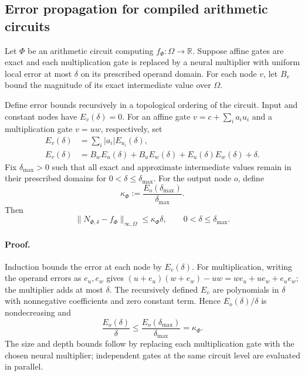 \subsection{Error propagation for compiled arithmetic circuits}
\label{app:circuit-error}

Let $\Phi$ be an arithmetic circuit computing
$f_\Phi:\Omega\to\mathbb R$. Suppose affine gates are exact and each
multiplication gate is replaced by a neural multiplier with uniform local
error at most $\delta$ on its prescribed operand domain. For each node $v$,
let $B_v$ bound the magnitude of its exact intermediate value over $\Omega$.

Define error bounds recursively in a topological ordering of the circuit.
Input and constant nodes have $E_v(\delta)=0$. For an affine gate
$v=c+\sum_i a_i u_i$ and a multiplication gate $v=uw$, respectively, set
\begin{align*}
 E_v(\delta)&=\sum_i |a_i|E_{u_i}(\delta),\\
 E_v(\delta)&=B_wE_u(\delta)+B_uE_w(\delta)
             +E_u(\delta)E_w(\delta)+\delta.
\end{align*}
Fix $\delta_{\max}>0$ such that all exact and approximate intermediate
values remain in their prescribed domains for $0<\delta\le\delta_{\max}$.
For the output node $o$, define
\[
 \kappa_\Phi:=\frac{E_o(\delta_{\max})}{\delta_{\max}}.
\]
Then
\[
 \|N_{\Phi,\delta}-f_\Phi\|_{\infty,\Omega}
 \le\kappa_\Phi\delta,
 \qquad 0<\delta\le\delta_{\max}.
\]

\paragraph{Proof.}
Induction bounds the error at each node by $E_v(\delta)$.
For multiplication, writing the operand errors as $e_u,e_w$ gives
$(u+e_u)(w+e_w)-uw=we_u+ue_w+e_ue_w$; the multiplier adds at most
$\delta$. The recursively defined $E_v$ are polynomials in $\delta$
with nonnegative coefficients and zero constant term. Hence
$E_o(\delta)/\delta$ is nondecreasing and
\[
 \frac{E_o(\delta)}{\delta}
 \le\frac{E_o(\delta_{\max})}{\delta_{\max}}=\kappa_\Phi.
\]
The size and depth bounds follow by replacing each multiplication gate
with the chosen neural multiplier; independent gates at the same circuit
level are evaluated in parallel.
